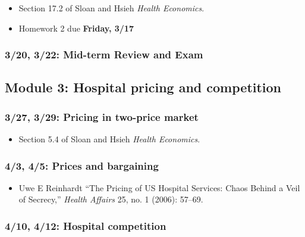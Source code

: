 \documentclass[11pt,]{article}
\providecommand{\tightlist}{%
  \setlength{\itemsep}{0pt}\setlength{\parskip}{0pt}}
\begin{document}
\begin{itemize}
\tightlist
\item
  Section 17.2 of Sloan and Hsieh \emph{Health Economics}.
\item
  Homework 2 due \textbf{Friday, 3/17}
\end{itemize}

\hypertarget{mid-term-review-and-exam}{%
\subsubsection{3/20, 3/22: Mid-term Review and
Exam}\label{mid-term-review-and-exam}}

\hypertarget{module-3-hospital-pricing-and-competition}{%
\subsection{Module 3: Hospital pricing and
competition}\label{module-3-hospital-pricing-and-competition}}

\hypertarget{pricing-in-two-price-market}{%
\subsubsection{3/27, 3/29: Pricing in two-price
market}\label{pricing-in-two-price-market}}

\begin{itemize}
\tightlist
\item
  Section 5.4 of Sloan and Hsieh \emph{Health Economics}.
\end{itemize}

\hypertarget{prices-and-bargaining}{%
\subsubsection{4/3, 4/5: Prices and
bargaining}\label{prices-and-bargaining}}

\begin{itemize}
\tightlist
\item
  Uwe E Reinhardt {``The Pricing of {US} Hospital Services: Chaos Behind
  a Veil of Secrecy,''} \emph{Health Affairs} 25, no. 1 (2006): 57--69.
\end{itemize}

\hypertarget{hospital-competition}{%
\subsubsection{4/10, 4/12: Hospital
competition}\label{hospital-competition}}
\end{document}
